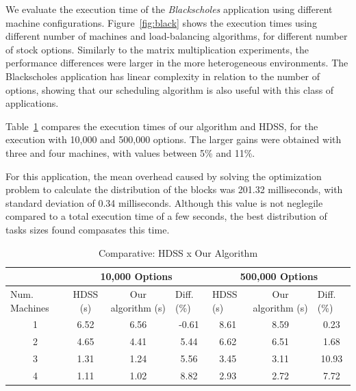 \documentclass[journal]{IEEEtran}
\begin{document}
We evaluate the execution time of the \emph{Blackscholes} application using
different machine configurations. Figure~\ref{fig:black} shows the execution
times using different number of machines and load-balancing algorithms, for
different number of stock options. Similarly to the matrix multiplication
experiments, the performance differences were larger in the more heterogeneous
environments. The Blackscholes application has linear complexity in relation to
the number of options, showing that our scheduling algorithm is also useful with
this class of applications.

Table~\ref{table: black} compares the execution times of our algorithm and HDSS,
for the execution with 10,000 and 500,000 options. The larger gains were
obtained with three and four machines, with values between 5\% and 11\%.

For this application, the mean overhead caused by solving the optimization
problem to calculate the distribution of the blocks was 201.32 milliseconds,
with standard deviation of 0.34 milliseconds. Although this value is not
neglegile compared to a total execution time of a few seconds, the best
distribution of tasks sizes found compasates this time.




\begin{table}[htb]
\centering
\caption{Comparative: HDSS x Our Algorithm}
\begin{tabular}{c|c|c|c|c|c|c|}
\cline{2-7}
\multicolumn{1}{l|}{}                 & \multicolumn{3}{c|}{10,000 Options}                              & \multicolumn{3}{c|}{500,000 Options}                                                  \\ \hline
\multicolumn{1}{|l|}{Num. Machines} & HDSS (s) & Our algorithm (s) & \multicolumn{1}{l|}{Diff. (\%)} & \multicolumn{1}{l|}{HDSS (s)} & Our algorithm (s) & \multicolumn{1}{l|}{Diff. (\%)} \\ \hline
\multicolumn{1}{|c|}{1 }       & 6.52     & 6.56              &    -0.61                       
			 & 8.61                          & 8.59              &   0.23                         \\ \hline
\multicolumn{1}{|c|}{2 }      & 4.65     & 4.41              &    5.44                         
				& 6.62                          & 6.51              & 1.68                            \\ \hline
\multicolumn{1}{|c|}{3 }      & 1.31     & 1.24              & 5.56                            
			& 3.45                          & 3.11              &         10.93                    \\ \hline
\multicolumn{1}{|c|}{4 }      & 1.11     & 1.02              & 8.82                       
			    & 2.93                          & 2.72              &         7.72                  \\ \hline
\end{tabular}
\label{table: black}
\end{table}
\end{document}
